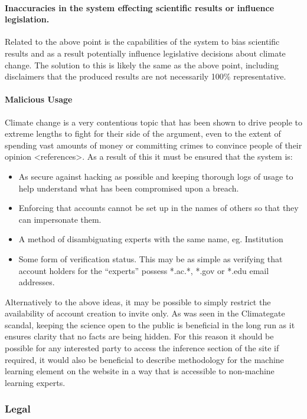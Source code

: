 \documentclass[11pt]{article} %
\numberwithin{equation}{section}
\begin{document}
\paragraph{Inaccuracies in the system effecting scientific results or influence
legislation. }

Related to the above point is the capabilities of the system to bias
scientific results and as a result potentially influence legislative
decisions about climate change. The solution to this is likely the
same as the above point, including disclaimers that the produced results
are not necessarily 100\% representative. 

\paragraph{Malicious Usage}

Climate change is a very contentious topic that has been shown to
drive people to extreme lengths to fight for their side of the argument,
even to the extent of spending vast amounts of money or committing
crimes to convince people of their opinion <references>. As a result
of this it must be ensured that the system is:
\begin{itemize}
\item As secure against hacking as possible and keeping thorough logs of
usage to help understand what has been compromised upon a breach.
\item Enforcing that accounts cannot be set up in the names of others so
that they can impersonate them. 
\item A method of disambiguating experts with the same name, eg. Institution
\item Some form of verification status. This may be as simple as verifying
that account holders for the ``experts'' possess {*}.ac.{*}, {*}.gov
or {*}.edu email addresses. 
\end{itemize}
Alternatively to the above ideas, it may be possible to simply restrict
the availability of account creation to invite only. As was seen in
the Climategate scandal, keeping the science open to the public is
beneficial in the long run as it ensures clarity that no facts are
being hidden. For this reason it should be possible for any interested
party to access the inference section of the site if required, it
would also be beneficial to describe methodology for the machine learning
element on the website in a way that is accessible to non-machine
learning experts.

\subsubsection{Legal }
\end{document}
